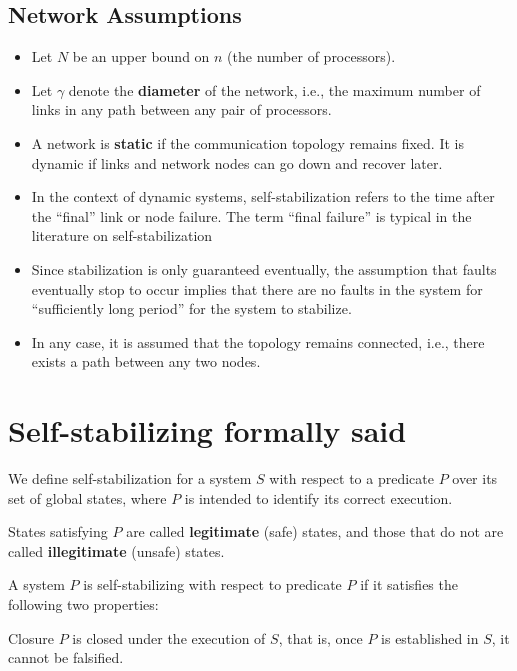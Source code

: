 \subsection{Network Assumptions}
\begin{itemize}
   \item Let $N$ be an upper bound on $n$ (the number of processors).
   \item Let $\gamma$ denote the \textbf{diameter} of the network, i.e., the maximum number of links in any path between any pair of processors.
   \item A network is \textbf{static} if the communication topology remains fixed. It is dynamic if links and network nodes can go down and recover later.
   \item In the context of dynamic systems, self-stabilization refers to the time after the “final” link or node failure. The
   term “final failure” is typical in the literature on self-stabilization
   \item Since stabilization is only guaranteed eventually, the assumption that faults eventually stop to occur implies
   that there are no faults in the system for “sufficiently long period” for the system to stabilize.
   \item In any case, it is assumed that the topology remains connected, i.e., there exists a path between any two
   nodes.
\end{itemize}

\section{Self-stabilizing formally said}
We define self-stabilization for a system $S$ with respect to a predicate $P$ over its set of global states, where $P$ is intended to identify its correct execution.

States satisfying $P$ are called \textbf{legitimate} (safe) states, and those that do not are called \textbf{illegitimate} (unsafe) states.

A system $P$ is self-stabilizing with respect to predicate $P$ if it satisfies the following two properties:

Closure $P$ is closed under the execution of $S$, that is, once $P$ is established in $S$, it cannot be falsified.

